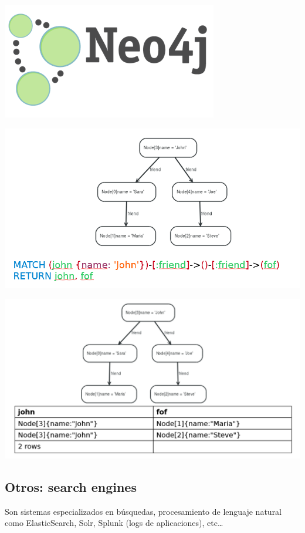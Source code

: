 \documentclass[
]{book}
\begin{document}
\includegraphics{images/Neo4jlogo.png}

\includegraphics{images/CypherQuery.png}

\includegraphics{images/CypherResult.png}

\hypertarget{otros-search-engines}{%
\subsection{Otros: search engines}\label{otros-search-engines}}

Son sistemas especializados en búsquedas, procesamiento de lenguaje natural como ElasticSearch, Solr, Splunk (logs de aplicaciones), etc\ldots{}
\end{document}
